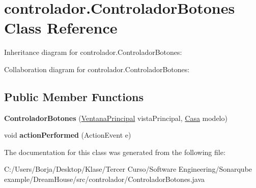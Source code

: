\hypertarget{classcontrolador_1_1_controlador_botones}{}\section{controlador.\+Controlador\+Botones Class Reference}
\label{classcontrolador_1_1_controlador_botones}


Inheritance diagram for controlador.\+Controlador\+Botones\+:


Collaboration diagram for controlador.\+Controlador\+Botones\+:
\subsection*{Public Member Functions}
\begin{DoxyCompactItemize}
\item 
\mbox{\label{classcontrolador_1_1_controlador_botones_ad14c7f5b59b1e67e9af9019f7e309432}} 
{\bfseries Controlador\+Botones} (\mbox{\hyperlink{classvista_1_1_ventana_principal}{Ventana\+Principal}} vista\+Principal, \mbox{\hyperlink{classmodelo_1_1_casa}{Casa}} modelo)
\item 
\mbox{\label{classcontrolador_1_1_controlador_botones_a73a3073a9dd8e1d62ba20831005ecb48}} 
void {\bfseries action\+Performed} (Action\+Event e)
\end{DoxyCompactItemize}


The documentation for this class was generated from the following file\+:\begin{DoxyCompactItemize}
\item 
C\+:/\+Users/\+Borja/\+Desktop/\+Klase/\+Tercer Curso/\+Software Engineering/\+Sonarqube example/\+Dream\+House/src/controlador/Controlador\+Botones.\+java\end{DoxyCompactItemize}
